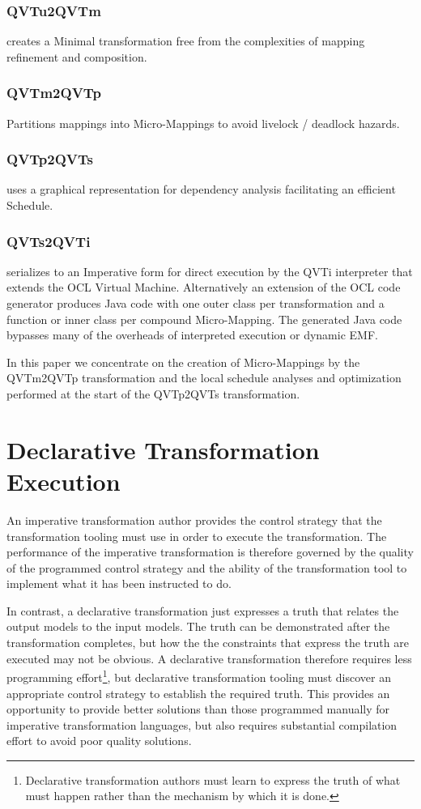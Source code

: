 \documentclass[conference]{IEEEtran}
\begin{document}
\subsubsection{QVTu2QVTm} creates a Minimal transformation free from the complexities of mapping refinement and composition.

\subsubsection{QVTm2QVTp} Partitions mappings into Micro-Mappings to avoid livelock / deadlock hazards.

\subsubsection{QVTp2QVTs} uses a graphical representation for dependency analysis facilitating an efficient Schedule.

\subsubsection{QVTs2QVTi} serializes to an Imperative form for direct execution by the QVTi interpreter that extends the OCL Virtual Machine. Alternatively an extension of the OCL code generator produces Java code with one outer class per transformation and a function or inner class per compound Micro-Mapping. The generated Java code bypasses many of the overheads of interpreted execution or dynamic EMF.

In this paper we concentrate on the creation of Micro-Mappings by the QVTm2QVTp transformation and the local schedule analyses and optimization performed at the start of the QVTp2QVTs transformation.

\section{Declarative Transformation Execution}\label{Declarative Transformation Execution}

An imperative transformation author provides the control strategy that the transformation tooling must use in order to execute the transformation. The performance of the imperative transformation is therefore governed by the quality of the programmed control strategy and the ability of the transformation tool to implement what it has been instructed to do.

In contrast, a declarative transformation just expresses a truth that relates the output models to the input models. The truth can be demonstrated after the transformation completes, but how the the constraints that express the truth are executed may not be obvious. A declarative transformation therefore requires less programming effort\footnote{Declarative transformation authors must learn to express the truth of what must happen rather than the mechanism by which it is done.}, but declarative transformation tooling must discover an appropriate control strategy to establish the required truth. This provides an opportunity to provide better solutions than those programmed manually for imperative transformation languages, but also requires substantial compilation effort to avoid poor quality solutions.
\end{document}

